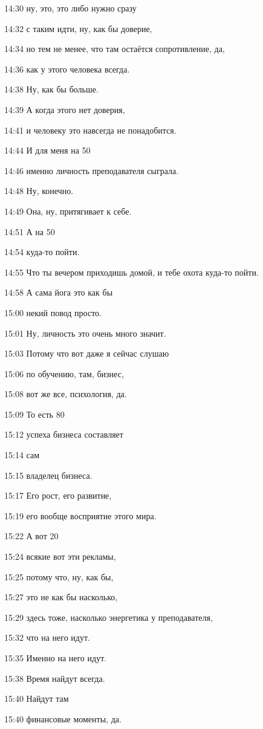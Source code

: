 14:30
ну, это, это либо нужно сразу

14:32
с таким идти, ну, как бы доверие,

14:34
но тем не менее, что там остаётся сопротивление, да,

14:36
как у этого человека всегда.

14:38
Ну, как бы больше.

14:39
А когда этого нет доверия,

14:41
и человеку это навсегда не понадобится.

14:44
И для меня на 50%

14:46
именно личность преподавателя сыграла.

14:48
Ну, конечно.

14:49
Она, ну, притягивает к себе.

14:51
А на 50%

14:54
куда-то пойти.

14:55
Что ты вечером приходишь домой, и тебе охота куда-то пойти.

14:58
А сама йога это как бы

15:00
некий повод просто.

15:01
Ну, личность это очень много значит.

15:03
Потому что вот даже я сейчас слушаю

15:06
по обучению, там, бизнес,

15:08
вот же все, психология, да.

15:09
То есть 80%

15:12
успеха бизнеса составляет

15:14
сам

15:15
владелец бизнеса.

15:17
Его рост, его развитие,

15:19
его вообще восприятие этого мира.

15:22
А вот 20%

15:24
всякие вот эти рекламы,

15:25
потому что, ну, как бы,

15:27
это не как бы насколько,

15:29
здесь тоже, насколько энергетика у преподавателя,

15:32
что на него идут.

15:35
Именно на него идут.

15:38
Время найдут всегда.

15:40
Найдут там

15:40
финансовые моменты, да.

